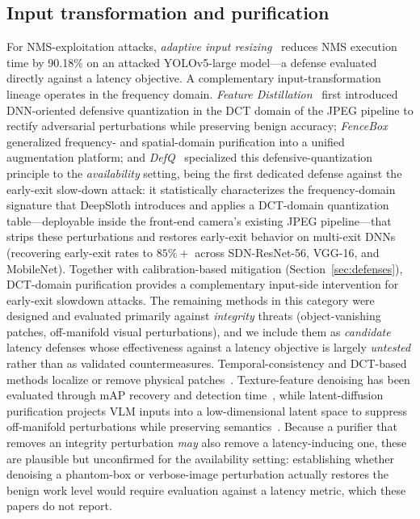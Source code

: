 \documentclass[acmsmall,screen,review,nonacm]{acmart}
\begin{document}
\subsection{Input transformation and purification}
\label{sec:inputtransform}
For NMS-exploitation attacks, \emph{adaptive input resizing}~\cite{schoof2024beyond} reduces NMS execution time by 90.18\% on an attacked YOLOv5-large model---a defense evaluated directly against a latency objective. A complementary input-transformation lineage operates in the frequency domain. \emph{Feature Distillation}~\cite{liu2019featuredistill} first introduced DNN-oriented defensive quantization in the DCT domain of the JPEG pipeline to rectify adversarial perturbations while preserving benign accuracy; \emph{FenceBox}~\cite{qiu2020fencebox} generalized frequency- and spatial-domain purification into a unified augmentation platform; and \emph{DefQ}~\cite{qiu2023defq} specialized this defensive-quantization principle to the \emph{availability} setting, being the first dedicated defense against the early-exit slow-down attack: it statistically characterizes the frequency-domain signature that DeepSloth introduces and applies a DCT-domain quantization table---deployable inside the front-end camera's existing JPEG pipeline---that strips these perturbations and restores early-exit behavior on multi-exit DNNs (recovering early-exit rates to $85\%+$ across SDN-ResNet-56, VGG-16, and MobileNet). Together with calibration-based mitigation (Section~\ref{sec:defenses}), DCT-domain purification provides a complementary input-side intervention for early-exit slowdown attacks. The remaining methods in this category were designed and evaluated primarily against \emph{integrity} threats (object-vanishing patches, off-manifold visual perturbations), and we include them as \emph{candidate} latency defenses whose effectiveness against a latency objective is largely \emph{untested} rather than as validated countermeasures. Temporal-consistency and DCT-based methods localize or remove physical patches~\cite{mu2024adav,ren2025dct}. Texture-feature denoising has been evaluated through mAP recovery and detection time~\cite{liang2024securing}, while latent-diffusion purification projects VLM inputs into a low-dimensional latent space to suppress off-manifold perturbations while preserving semantics~\cite{li2025ldp}. Because a purifier that removes an integrity perturbation \emph{may} also remove a latency-inducing one, these are plausible but unconfirmed for the availability setting: establishing whether denoising a phantom-box or verbose-image perturbation actually restores the benign work level would require evaluation against a latency metric, which these papers do not report.
\end{document}
